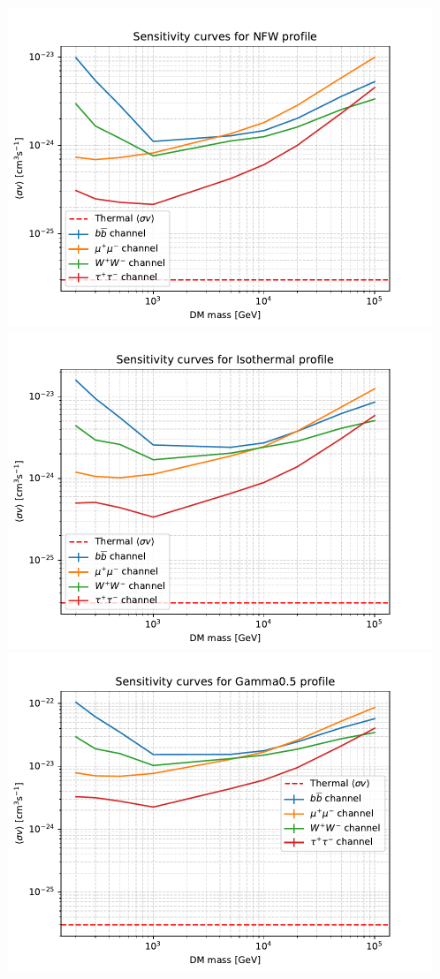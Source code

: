 \documentclass[main.tex]{subfiles}
\begin{document}
\begin{figure}
\centering
{}
\includegraphics[width=1\textwidth]{Pictures/Limits_NFW.pdf}
\endminipage 
{}
\includegraphics[width=1\textwidth]{Pictures/Limits_Isothermal.pdf}
\endminipage \\
\includegraphics[width=1\textwidth]{Pictures/Limits_Gamma0-5.pdf}

\end{figure}
\end{document}
